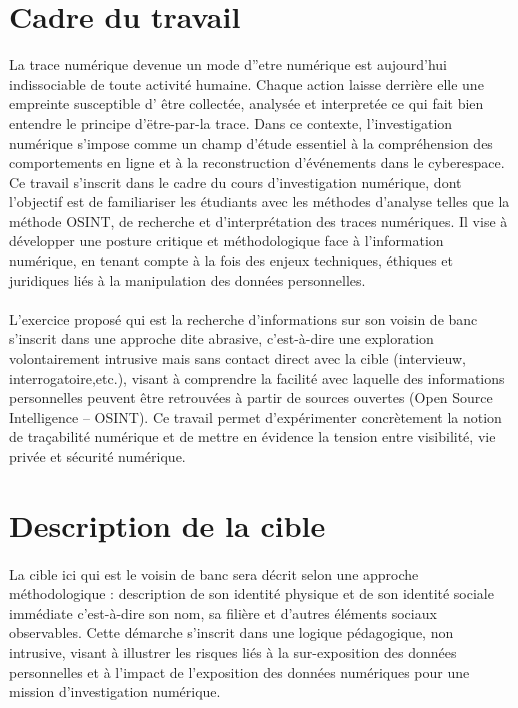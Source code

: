 \documentclass[memoire,12pt]{report}
\begin{document}
\section{Cadre du travail}
La trace numérique devenue un mode d''etre numérique est aujourd'hui indissociable de toute activité humaine. Chaque action laisse derrière elle une empreinte susceptible d' être collectée, analysée et interpretée ce qui fait bien entendre le principe d'ëtre-par-la trace. Dans ce contexte, l’investigation numérique s’impose comme un champ d’étude essentiel à la compréhension des comportements en ligne et à la reconstruction d’événements dans le cyberespace. Ce travail s’inscrit dans le cadre du cours d’investigation numérique, dont l’objectif est de familiariser les étudiants avec les méthodes d’analyse telles que la méthode OSINT, de recherche et d’interprétation des traces numériques. Il vise à développer une posture critique et méthodologique face à l’information numérique, en tenant compte à la fois des enjeux techniques, éthiques et juridiques liés à la manipulation des données personnelles.
\paragraph{}L’exercice proposé qui est la recherche d’informations sur son voisin de banc s’inscrit dans une approche dite abrasive, c’est-à-dire une exploration volontairement intrusive mais sans contact direct avec la cible (intervieuw, interrogatoire,etc.), visant à comprendre la facilité avec laquelle des informations personnelles peuvent être retrouvées à partir de sources ouvertes (Open Source Intelligence – OSINT). Ce travail permet d’expérimenter concrètement la notion de traçabilité numérique et de mettre en évidence la tension entre visibilité, vie privée et sécurité numérique.
\section{Description de la cible}
\paragraph{} La cible ici qui est le voisin de banc  sera décrit selon une approche méthodologique : description de son identité physique et de son identité sociale immédiate c'est-à-dire son nom, sa filière et d'autres éléments sociaux observables. Cette démarche s’inscrit dans une logique pédagogique, non intrusive, visant à illustrer les risques liés à la sur-exposition des données personnelles et à l'impact de l'exposition des données numériques pour une mission d'investigation numérique. 
\end{document}

